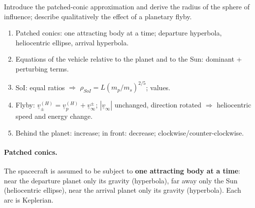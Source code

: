 \begin{qbox}
Introduce the patched-conic approximation and derive the radius of the sphere of influence; describe qualitatively the effect of a planetary flyby.
\end{qbox}
\begin{outline}
\begin{enumerate}
\item Patched conics: one attracting body at a time; departure hyperbola, heliocentric ellipse, arrival hyperbola.
\item Equations of the vehicle relative to the planet and to the Sun: dominant + perturbing terms.
\item SoI: equal ratios $\Rightarrow$ $\rho_{SoI}=L(m_p/m_s)^{2/5}$; values.
\item Flyby: $\underline v^{(H)}_\pm=\underline v^{(H)}_p+\underline v_\infty^\pm$; $|\underline v_\infty|$ unchanged, direction rotated $\Rightarrow$ heliocentric speed and energy change.
\item Behind the planet: increase; in front: decrease; clockwise/counter-clockwise.
\end{enumerate}
\end{outline}
\answer
\paragraph{Patched conics.} The spacecraft is assumed to be subject to \textbf{one attracting body at a time}: near the departure planet only its gravity
(hyperbola), far away only the Sun (heliocentric ellipse), near the arrival planet only its gravity (hyperbola). Each arc is Keplerian.


